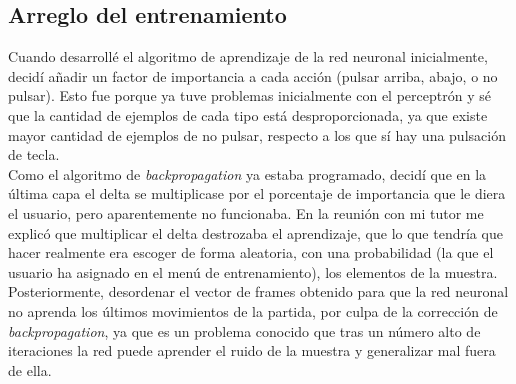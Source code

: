 \subsection{Arreglo del entrenamiento}
Cuando desarrollé el algoritmo de aprendizaje de la red neuronal inicialmente, decidí añadir un factor de importancia a cada acción (pulsar arriba, abajo, o no pulsar). Esto fue porque ya tuve problemas inicialmente con el perceptrón y sé que la cantidad de ejemplos de cada tipo está desproporcionada, ya que existe mayor cantidad de ejemplos de no pulsar, respecto a los que sí hay una pulsación de tecla.
\\
Como el algoritmo de \textit{backpropagation} ya estaba programado, decidí que en la última capa el delta se multiplicase por el porcentaje de importancia que le diera el usuario, pero aparentemente no funcionaba. En la reunión con mi tutor me explicó que multiplicar el delta destrozaba el aprendizaje, que lo que tendría que hacer realmente era escoger de forma aleatoria, con una probabilidad (la que el usuario ha asignado en el menú de entrenamiento), los elementos de la muestra. Posteriormente, desordenar el vector de frames obtenido para que la red neuronal no aprenda los últimos movimientos de la partida, por culpa de la corrección de \textit{backpropagation}, ya que es un problema conocido que tras un número alto de iteraciones la red puede aprender el ruido de la muestra y generalizar mal fuera de ella.

